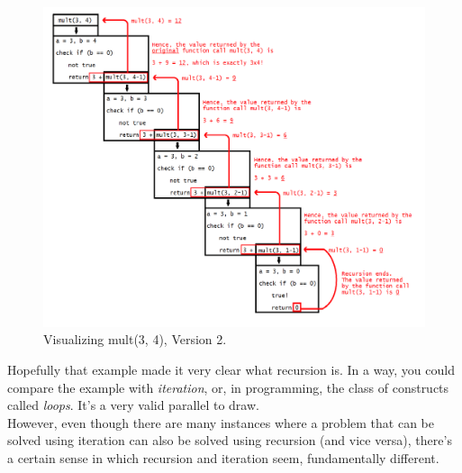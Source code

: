 \documentclass{article}
\begin{document}
\begin{figure}
    \centering
    \includegraphics[scale=0.415]{Recursion}
    \caption{Visualizing mult(3, 4), Version 2.}
    \label{Recursion}
\end{figure}
\FloatBarrier

\noindent Hopefully that example made it very clear what recursion is. In a way, you could compare the example with \textit{iteration}, or, in programming, the class of constructs called \textit{loops}. It's a very valid parallel to draw.\\

\noindent However, even though there are many instances where a problem that can be solved using iteration can also be solved using recursion (and vice versa), there's a certain sense in which recursion and iteration seem, fundamentally different.
\end{document}
